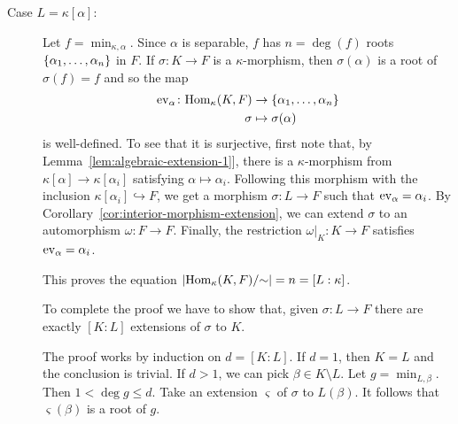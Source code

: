 \begin{solution}
    \begin{description}
        \item [{Case $L=\kappa[\alpha]$:}] Let $f=\min_{\kappa,\alpha}$. Since $\alpha$ is separable, $f$ has $n=\deg(f)$ roots $\{\alpha_1,\dots,\alpha_n\}$ in $F$. If $\sigma\colon K\to F$ is a $\kappa$-morphism, then $\sigma(\alpha)$ is a root of $\sigma(f)=f$ and so the map
        \begin{align*}
            {\rm ev}_{\alpha}\colon
                {\rm Hom}_\kappa(K,F)
                    &\to\{\alpha_1,\dots,\alpha_n\}\\
            \sigma&\mapsto\sigma(\alpha)
        \end{align*}
        is well-defined. To see that it is surjective, first note that, by Lemma~\ref{lem:algebraic-extension-1}], there is a $\kappa$-morphism from $\kappa[\alpha]\to\kappa[\alpha_i]$ satisfying $\alpha\mapsto\alpha_i$. Following this morphism with the inclusion $\kappa[\alpha_i]\hookrightarrow F$, we get a morphism $\sigma\colon L\to F$ such that ${\rm ev}_{\alpha}=\alpha_i$. By Corollary~\ref{cor:interior-morphism-extension}, we can extend $\sigma$ to an automorphism $\omega\colon F\to F$. Finally, the restriction $\omega|_K\colon K\to F$ satisfies ${\rm ev}_{\alpha}=\alpha_i$.

        This proves the equation $|{\rm Hom}_\kappa(K,F)/{\sim}|=n=[L:\kappa]$.

        To complete the proof we have to show that, given $\sigma\colon L\to F$ there are exactly $[K:L]$ extensions of $\sigma$ to $K$.

        The proof works by induction on $d=[K:L]$. If $d=1$, then $K=L$ and the conclusion is trivial. If $d>1$, we can pick $\beta\in K\setminus L$. Let $g=\min_{L,\beta}$. Then $1<\deg g\le d$. Take an extension $\varsigma$ of $\sigma$ to $L(\beta)$. It follows that $\varsigma(\beta)$ is a root of $g$.
    \end{description}
\end{solution}